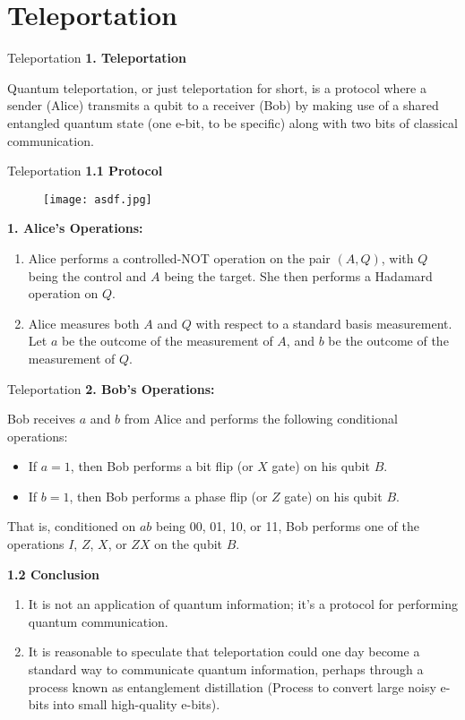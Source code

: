 \documentclass[12pt, aspectratio=169]{beamer}
\begin{document}
\section{Teleportation}
\begin{frame}{Teleportation}
\textbf{1. Teleportation}

Quantum teleportation, or just teleportation for short, is a protocol where a sender (Alice) transmits a qubit to a receiver (Bob) by making use of a shared entangled quantum state (one e-bit, to be specific) along with two bits of classical communication.

\end{frame}
\begin{frame}{Teleportation}
\textbf{1.1 Protocol}
\begin{figure}[h]
    \centering
    \texttt{[image: asdf.jpg]}
   
\end{figure}
\textbf{1. Alice's Operations:}

\begin{enumerate}
    \item Alice performs a controlled-NOT operation on the pair $(A,Q)$, with $Q$ being the control and $A$ being the target. She then performs a Hadamard operation on $Q$.
    
    \item Alice measures both $A$ and $Q$ with respect to a standard basis measurement. Let $a$ be the outcome of the measurement of $A$, and $b$ be the outcome of the measurement of $Q$.
\end{enumerate}
\end{frame}
\begin{frame}{Teleportation}
\textbf{2. Bob's Operations:}

Bob receives $a$ and $b$ from Alice and performs the following conditional operations:

\begin{itemize}
    \item If $a=1$, then Bob performs a bit flip (or $X$ gate) on his qubit $B$.
    
    \item If $b=1$, then Bob performs a phase flip (or $Z$ gate) on his qubit $B$.
\end{itemize}

That is, conditioned on $ab$ being 00, 01, 10, or 11, Bob performs one of the operations $I$, $Z$, $X$, or $ZX$ on the qubit $B$.

\textbf{1.2 Conclusion}

\begin{enumerate}
    \item It is not an application of quantum information; it's a protocol for performing quantum communication.
    
    \item It is reasonable to speculate that teleportation could one day become a standard way to communicate quantum information, perhaps through a process known as entanglement distillation (Process to convert large noisy e-bits into small high-quality e-bits).
\end{enumerate}

\end{frame}
\end{document}
